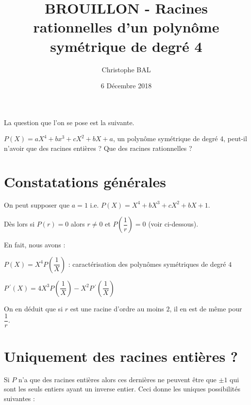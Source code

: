 \documentclass[12pt]{amsart}
\begin{document}
\title{BROUILLON - Racines rationnelles d'un polynôme symétrique de degré 4}
\author{Christophe BAL}
\date{6 Décembre 2018}
\maketitle

La question que l'on se pose est la suivante.

\begin{tcolorbox}
	$P(X) = a X^4 + b x^3 + c X^2 + b X + a$, un polynôme symétrique de degré 4, peut-il n'avoir que des racines entières ? Que des racines rationnelles ?
\end{tcolorbox}



\section{Constatations générales}

On peut supposer que $a = 1$ i.e. $P(X) = X^4 + b X^3 + c X^2 + b X + 1$.

Dès lors si $P(r) = 0$ alors $r \neq 0$ et $P\left( \dfrac1r \right) = 0$ (voir ci-dessous).

En fait, nous avons :

\medskip

$P(X) = X^4 P\left( \dfrac1X \right)$ : caractérisation des polynômes symétriques de degré $4$

\medskip

$P\,^{\prime}(X) = 4 X^3 P\left( \dfrac1X \right) 
            - X^2 P\,^{\prime}\left( \dfrac1X \right)$

%
%

On en déduit que si $r$ est une racine d'ordre au moins $2$, il en est de même pour $\dfrac1r$.


\section{Uniquement des racines entières ?}

Si $P$ n'a que des racines entières alors ces dernières ne peuvent être que $\pm 1$ qui sont les seuls entiers ayant un inverse entier. Ceci donne les uniques  possibilités suivantes :
\end{document}
